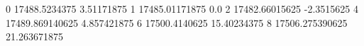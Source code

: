 0 17488.5234375 3.51171875
1 17485.01171875 0.0
2 17482.66015625 -2.3515625
4 17489.869140625 4.857421875
6 17500.4140625 15.40234375
8 17506.275390625 21.263671875
